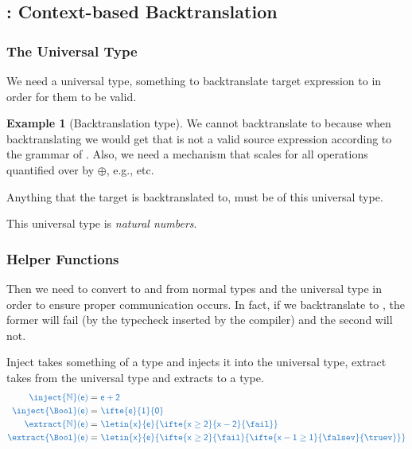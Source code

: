 \documentclass{article}
\theoremstyle{definition}
\newtheorem{example}[theorem]{Example}
\begin{document}
\subsection{\backtrts{\cdot}: Context-based Backtranslation}
\subsubsection{The Universal Type}
We need a universal type, something to backtranslate target expression to in order for them to be valid.
\begin{example}[Backtranslation type]
We cannot backtranslate \trg{\truev} to \src{\truev} because when backtranslating  we would get  that is not a valid source expression according to the grammar of .
Also, we need a mechanism that scales for all operations quantified over by $\oplus$, e.g.,  etc.
\end{example}

Anything that the target is backtranslated to, must be of this universal type.
\begin{center}
	This universal type is \emph{natural numbers}.
\end{center}

\subsubsection{Helper Functions}
Then we need to convert to and from normal types and the universal type in order to ensure proper communication occurs.
In fact, if we backtranslate  to , the former will fail (by the typecheck inserted by the compiler) and the second will not.

Inject takes something of a type and injects it into the universal type, extract takes from the universal type and extracts to a type.
\begin{align*}
	\src{\inject{\Nat}(e)} 
		=&\ 
		\src{e+2}
	\\
	\src{\inject{\Bool}(e)} 
		=&\
		\src{\ifte{e}{1}{0}}
	\\
	\src{\extract{\Nat} (e)} 
		=&\ 
		\src{\letin{x}{e}{\ifte{x\geq 2}{x-2}{\fail}}}
	\\
	\src{\extract{\Bool} (e)} 
		=&\ 
		\src{\letin{x}{e}{\ifte{x \geq 2}{\fail}{\ifte{x-1\geq 1}{\falsev}{\truev}}}}
\end{align*}


\end{document}
